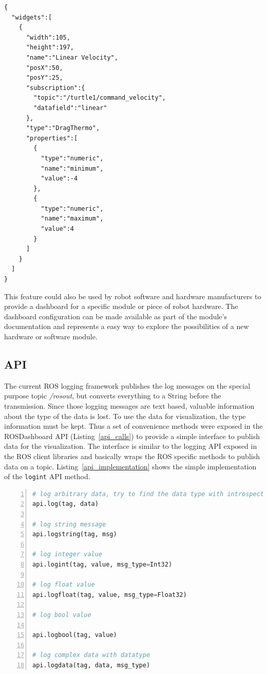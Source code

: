 \begin{lstlisting}[float,frame=single,caption={Example dashboard configuration in JSON.},label=json_example]
{
  "widgets":[
    {
      "width":105,
      "height":197,
      "name":"Linear Velocity",
      "posX":50,
      "posY":25,
      "subscription":{
        "topic":"/turtle1/command_velocity",
        "datafield":"linear"
      },
      "type":"DragThermo",
      "properties":[
        {
          "type":"numeric",
          "name":"minimum",
          "value":-4
        },
        {
          "type":"numeric",
          "name":"maximum",
          "value":4
        }
      ]
    }
  ]
}
\end{lstlisting}

This feature could also be used by robot software and hardware manufacturers to provide a dashboard for a specific module or piece of robot hardware. The dashboard configuration can be made available as part of the module's documentation and represents a easy way to explore the possibilities of a new hardware or software module.


\subsection{API}
\label{api_section}
The current ROS logging framework publishes the log messages on the special purpose topic \emph{/rosout}, but converts everything to a String before the transmission. Since those logging messages are text based, valuable information about the type of the data is lost. To use the data for visualization, the type information must be kept. Thus a set of convenience methods were exposed in the ROSDashboard API (Listing~\ref{api_calls}) to provide a simple interface to publish data for the visualization. The interface is similar to the logging API exposed in the ROS client libraries and basically wraps the ROS specific methods to publish data on a topic. Listing~\ref{api_implementation} shows the simple implementation of the \verb+logint+ API method.

\begin{lstlisting}[float,frame=single,caption={ROSDashboard API methods.},label=api_calls,language=Python,numbers=left,breaklines=true]
# log arbitrary data, try to find the data type with introspection
api.log(tag, data)

# log string message
api.logstring(tag, msg)

# log integer value
api.logint(tag, value, msg_type=Int32)

# log float value
api.logfloat(tag, value, msg_type=Float32)

# log bool value

api.logbool(tag, value)

# log complex data with datatype
api.logdata(tag, data, msg_type)
\end{lstlisting}

